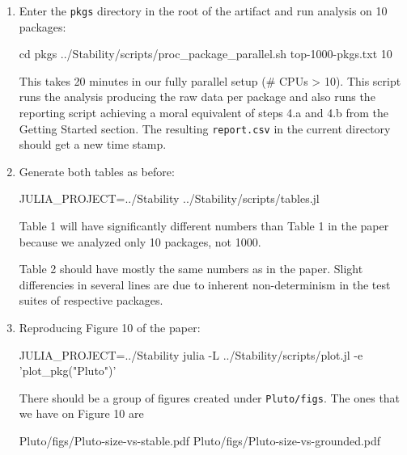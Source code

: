 \documentclass[
]{article}
\begin{document}
\begin{enumerate}
  \def\labelenumii{\alph{enumii}.}
  \item
    Enter the \texttt{pkgs} directory in the root of the artifact and run analysis
    on 10 packages:

\begin{verbnobox}[\small]
cd pkgs
../Stability/scripts/proc_package_parallel.sh top-1000-pkgs.txt 10
\end{verbnobox}

    This takes 20 minutes in our fully parallel setup (\# CPUs \textgreater{}
    10). This script runs the analysis producing the raw data per package and
    also runs the reporting script achieving a moral equivalent of steps 4.a and
    4.b from the Getting Started section. The resulting \texttt{report.csv}
    in the current directory should get a new time stamp.

  \item
    Generate both tables as before:

\begin{verbnobox}[\small]
JULIA_PROJECT=../Stability ../Stability/scripts/tables.jl
\end{verbnobox}

    Table 1 will have significantly different numbers than Table 1 in the paper
    because we analyzed only 10 packages, not 1000.

    Table 2 should have mostly the same numbers as in the paper. Slight
    differencies in several lines are due to inherent non-determinism in the
    test suites of respective packages.

  \item
    Reproducing Figure 10 of the paper:

\begin{verbnobox}[\small]
JULIA_PROJECT=../Stability julia -L ../Stability/scripts/plot.jl -e 'plot_pkg("Pluto")'
\end{verbnobox}

    There should be a group of figures created under
    \texttt{Pluto/figs}. The ones that we have on Figure 10 are

\begin{verbnobox}[\small]
Pluto/figs/Pluto-size-vs-stable.pdf
Pluto/figs/Pluto-size-vs-grounded.pdf
\end{verbnobox}

\end{enumerate}
\end{document}
